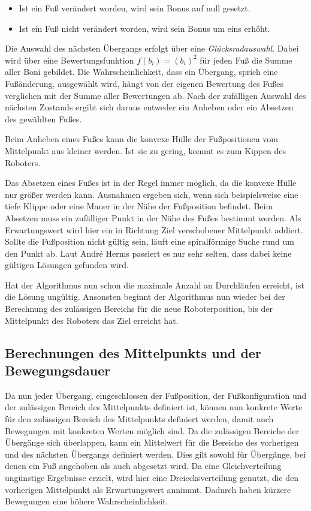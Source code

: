 \begin{itemize}
  \item Ist ein Fuß verändert worden, wird sein Bonus auf null gesetzt.
  \item Ist ein Fuß nicht verändert worden, wird sein Bonus um eins erhöht.
\end{itemize}

Die Auswahl des nächsten Übergangs erfolgt über eine \emph{Glücksradauswahl}. Dabei wird über eine Bewertungsfunktion $f(b_i) = (b_i)^2$ für jeden Fuß die Summe aller Boni gebildet. Die Wahrscheinlichkeit, dass ein Übergang, sprich eine Fußänderung, ausgewählt wird, hängt von der eigenen Bewertung des Fußes verglichen mit der Summe aller Bewertungen ab. Nach der zufälligen Auswahl des nächsten Zustands ergibt sich daraus entweder ein Anheben oder ein Absetzen des gewählten Fußes.

Beim Anheben eines Fußes kann die konvexe Hülle der Fußpositionen vom Mittelpunkt aus kleiner werden. Ist sie zu gering, kommt es zum Kippen des Roboters.

Das Absetzen eines Fußes ist in der Regel immer möglich, da die konvexe Hülle nur größer werden kann. Ausnahmen ergeben sich, wenn sich beispielsweise eine tiefe Klippe oder eine Mauer in der Nähe der Fußposition befindet. Beim Absetzen muss ein zufälliger Punkt in der Nähe des Fußes bestimmt werden. Als Erwartungswert wird hier ein in Richtung Ziel verschobener Mittelpunkt addiert. Sollte die Fußposition nicht gültig sein, läuft eine spiralförmige Suche rund um den Punkt ab. Laut André Herms passiert es nur sehr selten, dass dabei keine gültigen Lösungen gefunden wird.

Hat der Algorithmus nun schon die maximale Anzahl an Durchläufen erreicht, ist die Lösung ungültig. Ansonsten beginnt der Algorithmus nun wieder bei der Berechnung des zulässigen Bereichs für die neue Roboterposition, bis der Mittelpunkt des Roboters das Ziel erreicht hat.

\subsection{Berechnungen des Mittelpunkts und der Bewegungsdauer}

Da nun jeder Übergang, eingeschlossen der Fußposition, der Fußkonfiguration und der zulässigen Bereich des Mittelpunkts definiert ist, können nun konkrete Werte für den zulässigen Bereich des Mittelpunkts definiert werden, damit auch Bewegungen mit konkreten Werten möglich sind. Da die zulässigen Bereiche der Übergänge sich überlappen, kann ein Mittelwert für die Bereiche des vorherigen und des nächsten Übergangs definiert werden. Dies gilt sowohl für Übergänge, bei denen ein Fuß angehoben als auch abgesetzt wird. Da eine Gleichverteilung ungünstige Ergebnisse erzielt, wird hier eine Dreiecksverteilung genutzt, die den vorherigen Mittelpunkt als Erwartungswert annimmt. Dadurch haben kürzere Bewegungen eine höhere Wahrscheinlichkeit.  

